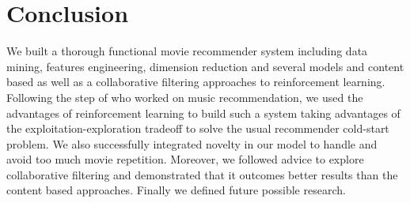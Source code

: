 \documentclass[letterpaper]{article}
\begin{document}
\section{Conclusion}

We built a thorough functional movie recommender system including data mining, features engineering, dimension reduction and several models and content based as well as a collaborative filtering approaches to reinforcement learning. 
Following the step of \cite{main} who worked on music recommendation, we used the advantages of reinforcement learning to build such a system taking advantages of the exploitation-exploration tradeoff to solve the usual recommender cold-start problem. We also successfully integrated novelty in our model to handle and avoid too much movie repetition. Moreover, we followed \cite{main} advice to explore collaborative filtering and demonstrated that it outcomes better results than the content based approaches. Finally we defined future possible research.


\footnotesize


\end{document}
